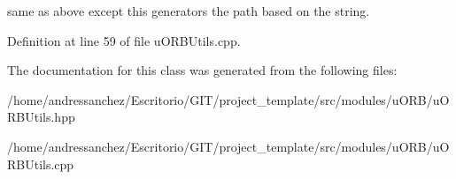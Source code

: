 same as above except this generators the path based on the string. 

Definition at line 59 of file u\+O\+R\+B\+Utils.\+cpp.




The documentation for this class was generated from the following files\+:\begin{DoxyCompactItemize}
\item 
/home/andressanchez/\+Escritorio/\+G\+I\+T/project\+\_\+template/src/modules/u\+O\+R\+B/u\+O\+R\+B\+Utils.\+hpp\item 
/home/andressanchez/\+Escritorio/\+G\+I\+T/project\+\_\+template/src/modules/u\+O\+R\+B/u\+O\+R\+B\+Utils.\+cpp\end{DoxyCompactItemize}
